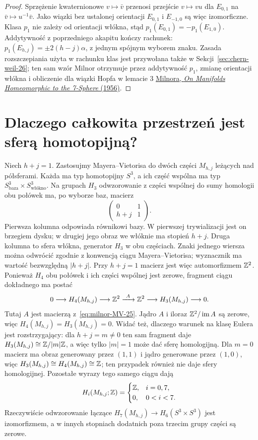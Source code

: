 \begin{proof}
Sprzężenie kwaternionowe $v\mapsto\bar v$
przenosi przejście $v\mapsto vu$ dla
$E_{0,1}$ na $\bar v\mapsto u^{-1}\bar v$.
Jako wiązki bez ustalonej orientacji
$E_{0,1}$ i $E_{-1,0}$ są więc izomorficzne.
Klasa $p_1$ nie zależy od orientacji włókna,
stąd $p_1(E_{0,1})=-p_1(E_{1,0})$.
Addytywność z poprzedniego akapitu kończy
rachunek: $p_1(E_{h,j})=\pm2(h-j)\alpha$,
z jednym spójnym wyborem znaku.
Zasada rozszczepiania użyta w rachunku
klas jest przywołana także w
Sekcji~\ref{sec:chern-weil-26};
ten sam wzór Milnor otrzymuje przez
addytywność $p_1$, zmianę orientacji
włókna i obliczenie dla wiązki Hopfa
w lemacie 3
\href{https://sites.math.rutgers.edu/~feehan/teaching/math866/milnor7sphere.pdf}
{Milnora, \emph{On Manifolds Homeomorphic to
the 7-Sphere} (1956)}.
\end{proof}

\section{Dlaczego całkowita przestrzeń jest
sferą homotopijną?}
\label{sec:milnor-homotopy-25}

Niech $h+j=1$. Zastosujmy
Mayera--Vietorisa do dwóch części
$M_{h,j}$ leżących nad półsferami.
Każda ma typ homotopijny $S^3$,
a ich część wspólna ma typ
$S^3_{\text{baza}}\times
S^3_{\text{włókno}}$.
Na grupach $H_3$ odwzorowanie z części
wspólnej do sumy homologii
obu połówek ma, po wyborze baz,
macierz
\begin{equation}\label{eq:milnor-MV-25}
 \begin{pmatrix}
 0&1\\
 h+j&1
 \end{pmatrix}.
\end{equation}
Pierwsza kolumna odpowiada
równikowi bazy. W pierwszej
trywializacji jest on brzegiem
dysku; w drugiej jego obraz
we włóknie ma stopień $h+j$.
Druga kolumna to sfera włókna,
generator $H_3$ w obu częściach.
Znaki jednego wiersza można
odwrócić zgodnie z konwencją
ciągu Mayera--Vietorisa;
wyznacznik ma wartość
bezwzględną $|h+j|$.
Przy $h+j=1$ macierz jest więc
automorfizmem $\mathbb{Z}^2$. Ponieważ
$H_4$ obu połówek i ich części
wspólnej jest zerowe, fragment
ciągu dokładnego ma postać
\[
 0\longrightarrow H_4(M_{h,j})
 \longrightarrow\mathbb{Z}^2
 \xrightarrow{\ A\ }
 \mathbb{Z}^2\longrightarrow H_3(M_{h,j})
 \longrightarrow0.
\]
Tutaj $A$ jest macierzą z~\eqref{eq:milnor-MV-25}.
Jądro $A$ i iloraz $\mathbb{Z}^2/\operatorname{im}A$
są zerowe,
więc $H_4(M_{h,j})=H_3(M_{h,j})=0$.
Widać też, dlaczego warunek na klasę
Eulera jest rozstrzygający: dla
$h+j=m\ne0$ ten sam fragment daje
$H_3(M_{h,j})\cong\mathbb{Z}/|m|\mathbb{Z}$,
a więc tylko $|m|=1$ może dać
sferę homologijną. Dla $m=0$ macierz ma obraz generowany
przez $(1,1)$ i jądro generowane przez $(1,0)$, więc
$H_3(M_{h,j})\cong H_4(M_{h,j})\cong\mathbb{Z}$;
ten przypadek również nie daje sfery homologijnej.
Pozostałe wyrazy tego samego
ciągu dają
\[
 H_i(M_{h,j};\mathbb{Z})=
 \begin{cases}
 \mathbb{Z},&i=0,7,\\
 0,&0<i<7.
 \end{cases}
\]
Rzeczywiście odwzorowanie łączące
$H_7(M_{h,j})\to H_6(S^3\times S^3)$
jest izomorfizmem, a w innych
stopniach dodatnich poza trzecim
grupy części są zerowe.

